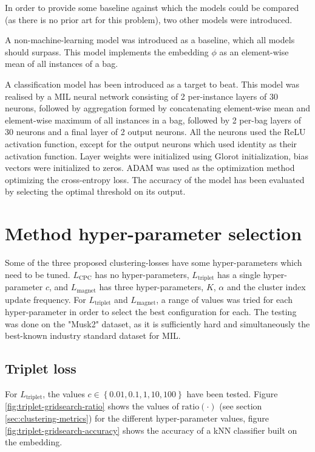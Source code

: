 In order to provide some baseline against which the models could be compared (as there is no prior art for this problem), two other models were introduced.

A non-machine-learning model was introduced as a baseline, which all models should surpass. This model implements the embedding \( \phi \) as an element-wise mean of all instances of a bag.

A classification model has been introduced as a target to beat. This model was realised by a MIL neural network consisting of 2 per-instance layers of 30 neurons, followed by aggregation formed by concatenating element-wise mean and element-wise maximum of all instances in a bag, followed by 2 per-bag layers of 30 neurons and a final layer of 2 output neurons. All the neurons used the ReLU activation function, except for the output neurons which used identity as their activation function. Layer weights were initialized using Glorot initialization, bias vectors were initialized to zeros. ADAM was used as the optimization method optimizing the cross-entropy loss. The accuracy of the model has been evaluated by selecting the optimal threshold on its output.

\section{Method hyper-parameter selection}

Some of the three proposed clustering-losses have some hyper-parameters which need to be tuned. \( L_\mathrm{CPC} \) has no hyper-parameters, \( L_\mathrm{triplet} \) has a single hyper-parameter \( c \), and \( L_\mathrm{magnet} \) has three hyper-parameters, \( K \), \( \alpha \) and the cluster index update frequency. For \( L_\mathrm{triplet} \) and \( L_\mathrm{magnet} \), a range of values was tried for each hyper-parameter in order to select the best configuration for each. The testing was done on the "Musk2" dataset, as it is sufficiently hard and simultaneously the best-known industry standard dataset for MIL.

\subsection{Triplet loss}
For \( L_\mathrm{triplet} \), the values \( c \in \left\{ 0.01, 0.1, 1, 10, 100 \right\} \) have been tested. Figure \ref{fig:triplet-gridsearch-ratio} shows the values of \( \mathrm{ratio} \left( \cdot \right) \) (see section \ref{sec:clustering-metrics}) for the different hyper-parameter values, figure \ref{fig:triplet-gridsearch-accuracy} shows the accuracy of a kNN classifier built on the embedding.

